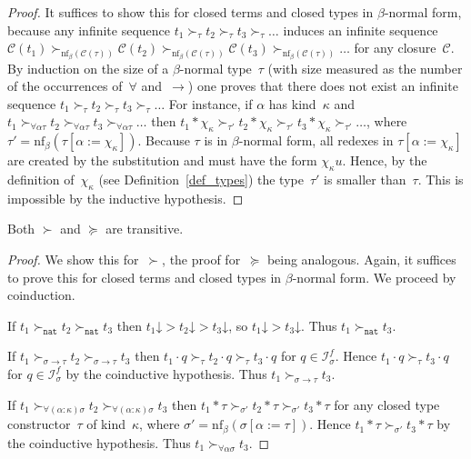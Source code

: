 \documentclass[a4paper,UKenglish,cleveref,autoref,numberwithinsect]{lipics-v2019}
\theoremstyle{definition}
\newcommand{\Iterms}{\mathcal{I}}
\newcommand{\arrtype}{\rightarrow}
\newcommand{\app}[2]{#1 \cdot #2}
\newcommand{\tapp}[2]{#1 * #2}
\newcommand{\subst}[2]{#1:=#2}
\newcommand{\nat}{\mathtt{nat}}
\newcommand{\cl}{\mathcal{C}}
\newcommand{\nf}{\mathrm{nf}}
\newcommand{\da}{\mathord{\downarrow}}
\begin{document}
\begin{proof}
  It suffices to show this for closed terms and closed types in
  $\beta$-normal form, because any infinite sequence $t_1 \succ_\tau
  t_2 \succ_\tau t_3 \succ_\tau \ldots$ induces an infinite sequence
  $\cl(t_1) \succ_{\nf_\beta(\cl(\tau))} \cl(t_2)
  \succ_{\nf_\beta(\cl(\tau))} \cl(t_3) \succ_{\nf_\beta(\cl(\tau))}
  \ldots$ for any closure~$\cl$. By induction on the size of a
  $\beta$-normal type~$\tau$ (with size measured as the number of the
  occurrences of~$\forall$ and~$\arrtype$) one proves that there does
  not exist an infinite sequence $t_1 \succ_\tau t_2 \succ_\tau t_3
  \succ_\tau \ldots$ For instance, if $\alpha$ has kind~$\kappa$ and
  $t_1 \succ_{\forall\alpha\tau} t_2 \succ_{\forall\alpha\tau} t_3
  \succ_{\forall\alpha\tau} \ldots$ then $\tapp{t_1}{\chi_\kappa}
  \succ_{\tau'} \tapp{t_2}{\chi_\kappa} \succ_{\tau'}
  \tapp{t_3}{\chi_\kappa} \succ_{\tau'} \ldots$, where
  $\tau'=\nf_\beta(\tau[\subst{\alpha}{\chi_\kappa}])$. Because $\tau$
  is in $\beta$-normal form, all redexes in
  $\tau[\subst{\alpha}{\chi_\kappa}]$ are created by the substitution
  and must have the form $\chi_\kappa u$. Hence, by the definition
  of~$\chi_\kappa$ (see Definition~\ref{def_types}) the
  type~$\tau'$ is smaller than~$\tau$. This is impossible by the
  inductive hypothesis.
\end{proof}

\begin{lemma}\label{lem_transitive}
  Both $\succ$ and $\succeq$ are transitive.
\end{lemma}

\begin{proof}
  We show this for~$\succ$, the proof for~$\succeq$ being
  analogous. Again, it suffices to prove this for closed terms and
  closed types in $\beta$-normal form. We proceed by coinduction.

  If $t_1 \succ_\nat t_2 \succ_\nat t_3$ then $t_1\da > t_2\da >
  t_3\da$, so $t_1\da > t_3\da$. Thus $t_1 \succ_\nat t_3$.

  If $t_1 \succ_{\sigma\arrtype\tau}t_2\succ_{\sigma\arrtype\tau}t_3$
  then $\app{t_1}{q}\succ_{\tau}\app{t_2}{q}\succ_\tau\app{t_3}{q}$
  for $q \in \Iterms^f_\sigma$. Hence
  $\app{t_1}{q}\succ_\tau\app{t_3}{q}$ for $q \in \Iterms^f_\sigma$ by
  the coinductive hypothesis. Thus $t_1\succ_{\sigma\arrtype\tau}
  t_3$.

  If $t_1
  \succ_{\forall(\alpha:\kappa)\sigma}t_2\succ_{\forall(\alpha:\kappa)\sigma}t_3$
  then
  $\tapp{t_1}{\tau}\succ_{\sigma'}\tapp{t_2}{\tau}\succ_{\sigma'}\tapp{t_3}{\tau}$
  for any closed type constructor~$\tau$ of kind~$\kappa$, where
  $\sigma' = \nf_\beta(\sigma[\subst{\alpha}{\tau}])$. Hence
  $\tapp{t_1}{\tau}\succ_{\sigma'}\tapp{t_3}{\tau}$ by the coinductive
  hypothesis. Thus $t_1\succ_{\forall\alpha\sigma} t_3$.
\end{proof}
\end{document}
